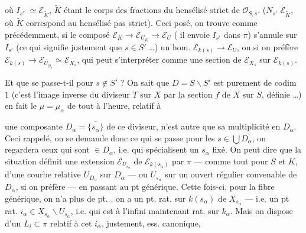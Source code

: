 \documentclass[11pt,a4paper]{article}
\begin{document}

où $I_{s'}$  $\simeq \mathcal{E}_{\tilde{K}}$, $\tilde{K}$
étant le corps des fractions du hensélisé \struck{\ill{}} strict de
$\mathcal{O}_{S,s}$. ($N_{s'}$   $\mathcal{E}_{\tilde{K}}$, où $\tilde{K}$ correspond au hensélisé
pas strict). Ceci posé, on trouve comme précédemment, si le composé
$\mathcal{E}_K \to \mathcal{E}_{U_K} \to \mathcal{E}_U$ ( il
envoie $I_{s'}$ dans $\pi$) s'annule sur $I_{s'}$ (ce qui signifie justement que
$s \in S'$ …)  un hom. $\mathcal{E}_{k(s)} \to \mathcal{E}_U$,
ou si on préfère
$\mathcal{E}_{k(s)} \to \mathcal{E}_{U_{\tilde{\mathcal{O}}_s}} \simeq \mathcal{E}_{X_s}$,
qui peut s'interpréter comme une section de $\mathcal{E}_{X_s}$ sur
$\mathcal{E}_{k(s)}$.

Et que se passe-t-il pour $s \notin S'$ ? \struck{\ill{}} On sait que
$D = S \smallsetminus S'$ est purement de codim~$1$ (c'est l'image inverse du
diviseur $T$ sur $X$ par la section $f$ de $X$ sur $S$, définie
 …) \ill{} en fait le $\mu = \mu_\alpha$ de tout
à l'heure, relatif à

une composante $D_\alpha = \overline{\{s_\alpha\}}$ de ce diviseur, n'est autre
que sa multiplicité en $D_\alpha$. Ceci rappelé, on se demande donc ce qui se
passe pour les $s \in \bigcup D_\alpha$,   
on regardera ceux qui sont $\in D_\alpha$,  i.e. qui
spécialisent un $s_\alpha$ fixé. On peut dire que la situation définit une
extension $\mathcal{E}_{U_{s_\alpha}}$ de $\mathcal{E}_{k(s_\alpha)}$ par $\pi$
—  comme tout pour $S$ et $K$, d'une courbe relative \ill{}
$U_{D_\alpha}$ sur $D_\alpha$ — ou $U_{s_\alpha}$ sur un ouvert régulier
convenable de $D_\alpha$, si on préfère — en passant au pt générique. Cette
fois-ci, pour la fibre générique, on n'a plus de  pt.
, on a un pt. rat. sur $k(s_\alpha)$ de $X_{s_\alpha}$ —
i.e. un pt rat. $i_\alpha \in X_{s_\alpha} \smallsetminus U_{s_\alpha}$, i.e.
qui est à l'infini \ill{} maintenant rat. sur $k_\alpha$. Mais on dispose d'un
$L_i \subset \pi$ relatif à cet $i_\alpha$, justement, 
ess. canonique,
\end{document}
